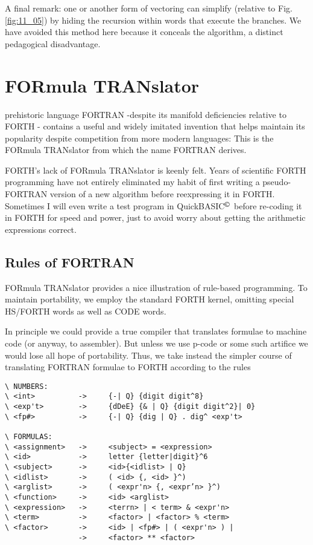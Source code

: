 \leftbar[1\linewidth]
A final remark: one or another form of vectoring can simplify  (relative to Fig. \ref{fig:11_05}) by hiding the recursion within words that execute the branches. We have avoided this method here because it conceals the algorithm, a distinct pedagogical disadvantage.
\endleftbar

\section{FORmula TRANslator}
 prehistoric language FORTRAN -despite its manifold deficiencies relative to FORTH - contains a useful and widely imitated invention that helps maintain its popularity despite competition from more modern languages: This is the FORmula TRANslator from which the name FORTRAN derives.

FORTH's lack of FORmula TRANslator is keenly felt. Years of scientific FORTH programming have not entirely eliminated my habit of first writing a pseudo-FORTRAN version of a new algorithm before reexpressing it in FORTH. Sometimes I will even write a test program in QuickBASIC$^{\copyright}$ before re-coding it in FORTH for speed and power, just to avoid worry about getting the arithmetic expressions correct.

\subsection{Rules of FORTRAN}
 FORmula TRANslator provides a nice illustration of rule-based programming. To maintain portability, we employ the standard FORTH kernel, omitting special HS/FORTH words as well as CODE words.

In principle we could provide a true compiler that translates formulae to machine code (or anyway, to assembler). But unless we use p-code or some such artifice we would lose all hope of portability. Thus, we take instead the simpler course of translating FORTRAN formulae to FORTH according to the rules

\begin{verbatim}
\ NUMBERS:
\ <int>          ->     {-| Q} {digit digit^8}
\ <exp't>        ->     {dDeE} {& | Q} {digit digit^2}| 0}
\ <fp#>          ->     {-| Q} {dig | Q} . dig^ <exp't>

\ FORMULAS:
\ <assignment>   ->     <subject> = <expression>
\ <id>           ->     letter {letter|digit}^6
\ <subject>      ->     <id>{<idlist> | Q}
\ <idlist>       ->     ( <id> {, <id> }^)
\ <arglist>      ->     ( <expr'n> {, <expr’n> }^)
\ <function>     ->     <id> <arglist>
\ <expression>   ->     <terrn> | < term> & <expr'n>
\ <term>         ->     <factor> | <factor> % <term>
\ <factor>       ->     <id> | <fp#> | ( <expr'n> ) |
                 ->     <factor> ** <factor>
\end{verbatim}

